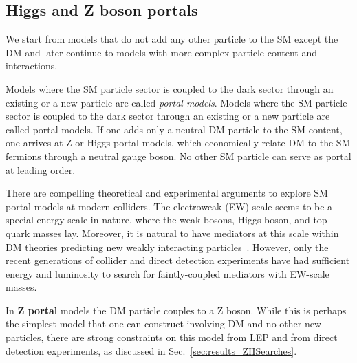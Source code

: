 \subsection{Higgs and Z boson portals}
\label{sec:HZPortalModels}

We start from models that do not add any other particle to the SM except the DM and later continue to models with more complex particle content and interactions. 

Models where the SM particle sector is coupled to the dark sector through an existing or a new particle are called \textit{portal models}. Models where the SM particle sector is coupled to the dark sector through an existing or a new particle are called portal models. If one adds only a neutral DM particle to the SM content, one arrives at Z or Higgs portal models, which economically relate DM to the SM fermions through a neutral gauge boson. No other SM particle can serve as portal at leading order. 


There are compelling theoretical and experimental arguments to explore SM portal models at modern colliders. 
The electroweak (EW) scale seems to be a special energy scale in nature, where the weak bosons, Higgs boson, and top quark masses lay. Moreover, it is natural to have mediators at this scale within DM theories predicting new weakly interacting particles~\cite{Cotta:2012nj,Arcadi:2014lta}.
However, only the recent generations of collider and direct detection experiments have had sufficient energy and luminosity to search for faintly-coupled mediators with EW-scale masses.

In \textbf{Z portal} models the DM particle couples to a Z boson. While this is perhaps the simplest model that one can construct involving DM and no other new particles, there are strong constraints on this model from LEP and from direct detection experiments, as discussed in Sec.~\ref{sec:results_ZHSearches}. 


